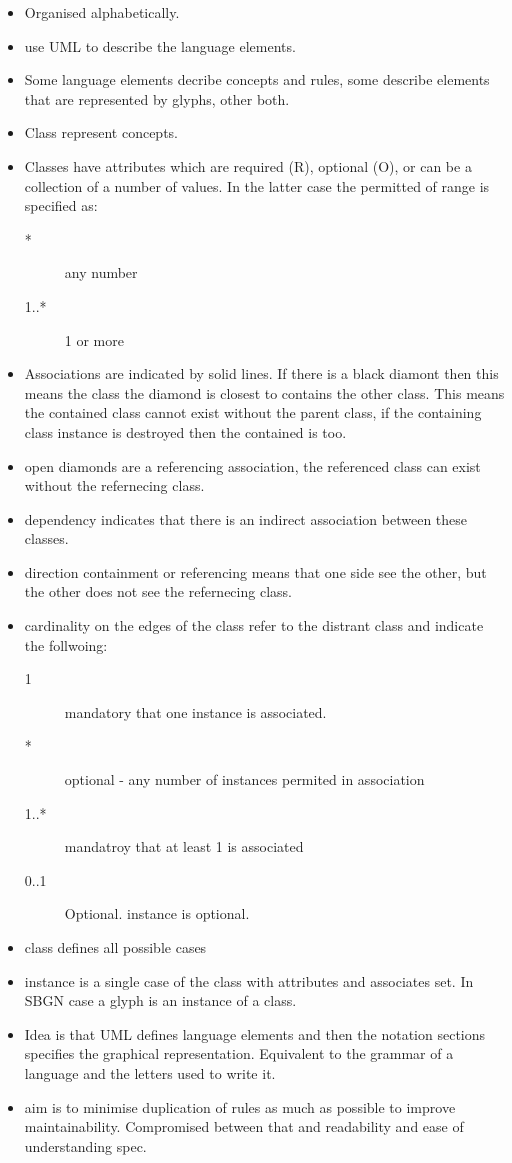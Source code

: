 \begin{itemize}
\item Organised alphabetically.
\item use UML to describe the language elements.
\item Some language elements decribe concepts and rules, some
  describe elements that are represented by glyphs, other both.
\item Class represent concepts.
\item Classes have attributes which are required (R), optional (O), or can be
  a collection of a number of values. In the latter case the permitted
  of range is specified as:
  \begin{description}
  \item[*] any number
  \item[1..*] 1 or more
  \end{description}
\item Associations are indicated by solid lines. If there is a black
  diamont then this means the class the diamond is closest to contains
  the other class. This means the contained class cannot exist without
  the parent class, \ie if the containing class instance is destroyed
  then the contained is too.
\item open diamonds are a referencing association, the referenced
  class can exist without the refernecing class.
\item dependency indicates that there is an indirect association
  between these classes.
\item direction containment or referencing means that one side see the
  other, but the other does not see the refernecing class.
\item cardinality on the edges of the class refer to the distrant
  class and indicate the follwoing:
  \begin{description}
  \item[1] mandatory that one instance is associated.
  \item[*] optional - any number of instances permited in association
  \item[1..*] mandatroy that at least 1 is associated
  \item[0..1] Optional. instance is optional.
  \end{description}
  \item class defines all possible cases
  \item instance is a single case of the class with attributes and
    associates set. In SBGN case a glyph is an instance of a class.
  \item Idea is that UML defines language elements and then the
    notation sections specifies the graphical
    representation. Equivalent to the grammar of a language and the
    letters used to write it.
  \item aim is to minimise duplication of rules as much as possible to
    improve maintainability. Compromised between that and readability
    and ease of understanding spec.
\end{itemize}

